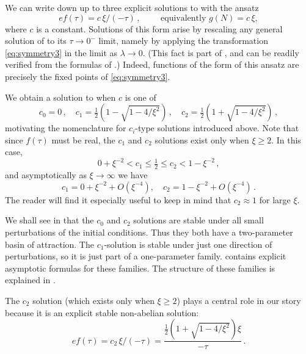 We can write down up to three explicit solutions to  with the ansatz 
\begin{equation}
ef(\tau)=c\,\xi/(-\tau)\,,\qquad\textrm{ equivalently }g(N)=c\,\xi,\label{eq:ansatz-f}
\end{equation}
where $c$ is a constant. Solutions of this form arise by rescaling any general solution of  to its $\tau\to0^{-}$ limit, namely by applying the transformation \eqref{eq:symmetry3} in the limit as $\lambda\to0$. (This fact is part of , and can be readily verified from the formulas of .) Indeed, functions of the form of this ansatz are precisely the fixed points of \eqref{eq:symmetry3}.

We obtain a solution to  when $c$ is one of 
\begin{equation}
c_{0}=0\,,\quad c_{1}=\tfrac{1}{2}(1-\sqrt{1-4/\xi^{2}})\,,\quad c_{2}=\tfrac{1}{2}(1+\sqrt{1-4/\xi^{2}})\,,\label{eq:c-definitions}
\end{equation}
motivating the nomenclature for $c_{i}$\nobreakdash-type solutions introduced above. Note that since $f(\tau)$ must be real, the $c_{1}$ and $c_{2}$ solutions exist only when $\xi\geq2$. In this case, 
\[
0+\xi^{-2}<c_{1}\leq\tfrac{1}{2}\leq c_{2}<1-\xi^{-2}\,,
\]
and asymptotically as $\xi\to\infty$ we have 
\begin{equation}
c_{1}=0+\xi^{-2}+O(\xi^{-4}),\quad c_{2}=1-\xi^{-2}+O(\xi^{-4})\,.\label{eq:c-asymptotics}
\end{equation}
The reader will find it especially useful to keep in mind that $c_{2}\approx1$ for large $\xi$.

We shall see in  that the $c_{0}$ and $c_{2}$ solutions are stable under all small perturbations of the initial conditions. Thus they both have a two-parameter basin of attraction. The $c_{1}$-solution is stable under just one direction of perturbations, so it is just part of a one-parameter family.  contains explicit asymptotic formulas for these families. The structure of these families is explained in .

The $c_{2}$ solution (which exists only when $\xi\geq2$) plays a central role in our story because it is an explicit stable non-abelian solution: 
\begin{equation}
ef(\tau)=c_{2}\,\xi/(-\tau)=\frac{\tfrac{1}{2}\left(1+\sqrt{1-4/\xi^{2}}\right)\xi}{-\tau}\,.\label{eq:c2solution}
\end{equation}

